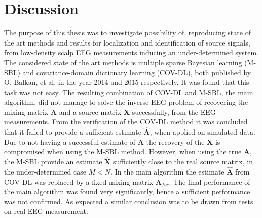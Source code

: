 \chapter{Discussion}
The purpose of this thesis was to investigate possibility of,
reproducing state of the art methods and results for localization and identification of source signals, from low-density scalp EEG measurements inducing an under-determined system.
The considered state of the art methods is multiple sparse Bayesian learning (M-SBL)\cite{Balkan2014} and covariance-domain dictionary learning (COV-DL)\cite{Balkan2015}, both published by O. Balkan, et al. in the year 2014 and 2015 respectively.   
It was found that this task was not easy. The resulting combination of COV-DL and M-SBL, the main algorithm, did not manage to solve the inverse EEG problem of recovering the mixing matrix $\textbf{A}$ and a source matrix $\textbf{X}$ successfully, from the EEG measurements. 
From the verification of the COV-DL method it was concluded that it failed to provide a sufficient estimate $\hat{\mathbf{A}}$, when applied on simulated data. 
Due to not having a successful estimate of $\textbf{A}$ the recovery of the $\textbf{X}$ is compromised when using the M-SBL method.
However, when using the true $\mathbf{A}$, the M-SBL provide an estimate $\hat{\mathbf{X}}$ sufficiently close to the real source matrix, in the under-determined case $M<N$. 
In the main algorithm the estimate $\hat{\textbf{A}}$ from COV-DL was replaced by a fixed mixing matrix $\textbf{A}_{fix}$. The final performance of the main algorithm was found very significantly, hence a sufficient performance was not confirmed. As expected a similar conclusion was to be drawn from tests on real EEG measurement. 

